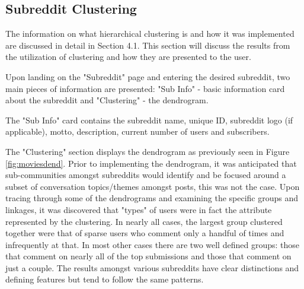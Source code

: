 \documentclass[msc,oneside]{ubcthesis}%
\begin{document}
\subsection{Subreddit Clustering}
The information on what hierarchical clustering is and how it was implemented are discussed in detail in Section 4.1. This section will discuss the results from the utilization of clustering and how they are presented to the user.
\par
Upon landing on the "Subreddit" page and entering the desired subreddit, two main pieces of information are presented: "Sub Info" - basic information card about the subreddit and "Clustering" - the dendrogram.
\par
The "Sub Info" card contains the subreddit name, unique ID, subreddit logo (if applicable), motto, description, current number of users and subscribers.
\par
The "Clustering" section displays the dendrogram as previously seen in Figure \ref{fig:moviesdend}. Prior to implementing the dendrogram, it was anticipated that sub-communities amongst subreddits would identify and be focused around a subset of conversation topics/themes amongst posts, this was not the case. Upon tracing through some of the dendrograms and examining the specific groups and linkages, it was discovered that "types" of users were in fact the attribute represented by the clustering. In nearly all cases, the largest group clustered together were that of sparse users who comment only a handful of times and infrequently at that. In most other cases there are two well defined groups: those that comment on nearly all of the top submissions and those that comment on just a couple. The results amongst various subreddits have clear distinctions and defining features but tend to follow the same patterns.
\end{document}
